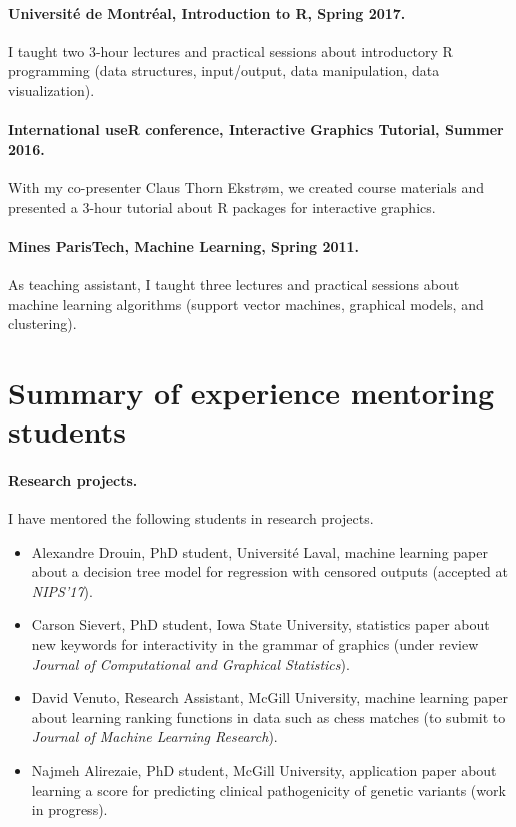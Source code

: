 \documentclass{article}
\begin{document}
\paragraph{Universit\'e de Montr\'eal, Introduction to R, Spring
  2017.} I taught two 3-hour lectures and practical sessions about
introductory R programming (data structures, input/output, data
manipulation, data visualization).

\paragraph{International useR conference, Interactive Graphics
  Tutorial, Summer 2016.} With my co-presenter Claus Thorn Ekstr\o m,
we created course materials and presented a 3-hour tutorial about R
packages for interactive graphics.

\paragraph{Mines ParisTech, Machine Learning, Spring 2011.} As
teaching assistant, I taught three lectures and practical sessions
about machine learning algorithms (support vector machines, graphical
models, and clustering).

\section{Summary of experience mentoring students}

\paragraph{Research projects.} I have mentored the following
students in research projects.
\begin{itemize}
\item Alexandre Drouin, PhD student, Universit\'e Laval, machine
  learning paper about a decision tree model for regression with
  censored outputs (accepted at \emph{NIPS'17}).
\item Carson Sievert, PhD student, Iowa State University, statistics
  paper about new keywords for interactivity in the grammar of
  graphics (under review \emph{Journal of Computational and Graphical
    Statistics}).
\item David Venuto, Research Assistant, McGill University, machine
  learning paper about learning ranking functions in data such as
  chess matches (to submit to \emph{Journal of Machine Learning
    Research}).
\item Najmeh Alirezaie, PhD student, McGill University, application
  paper about learning a score for predicting clinical pathogenicity
  of genetic variants (work in progress).
\end{itemize}
\end{document}
